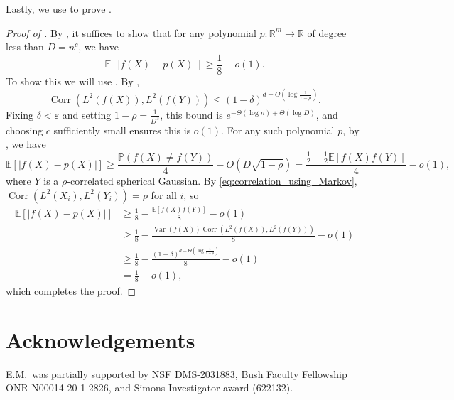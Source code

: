\documentclass[12pt,letterpaper]{amsart}
\def\E{\mathbb{E}}
\def\P{\mathbb{P}}
\def\R{\mathbb{R}}
\def\Var{\operatorname{Var}}
\def\Corr{\operatorname{Corr}}
\newcommand{\abs}[1]{\left\lvert#1\right\rvert}
\newcommand{\1}[1]{1_{\left\{#1\right\}}}
\theoremstyle{definition}
\theoremstyle{remark}
\begin{document}
Lastly, we use  to prove .
\begin{proof}[Proof of ]
    By \cite[Theorem 1.7]{diakonikolas2021optimality}, it suffices to show that for any polynomial $p:\R^m\to\R$ of degree less than $D=n^c$, we have 
    \[ \E[\abs{f(X)-p(X)}]\geq\frac{1}{8}-o(1). \]
    To show this we will use \cite[Theorem 1.5]{diakonikolas2021optimality}.
    By ,
    \[ \Corr(L^2(f(X)),L^2(f(Y))) \leq (1-\delta)^{d-\Theta(\log\frac{1}{1-\rho})}. \]
    Fixing $\delta<\varepsilon$ and setting $1-\rho=\frac{1}{D^3}$, this bound is $e^{-\Theta(\log n)+\Theta(\log D)}$, and choosing $c$ sufficiently small ensures this is $o(1)$.
    For any such polynomial $p$, by \cite[Theorem 1.5]{diakonikolas2021optimality}, we have
    \[ \E[\abs{f(X)-p(X)}]\geq\frac{\P(f(X)\neq f(Y))}{4}-O(D\sqrt{1-\rho}) = \frac{\frac{1}{2}-\frac{1}{2}\E[f(X)f(Y)]}{4} - o(1), \]
    where $Y$ is a $\rho$-correlated spherical Gaussian.
    By \eqref{eq:correlation_using_Markov}, $\Corr(L^2(X_i),L^2(Y_i))=\rho$ for all $i$, so
    \begin{align*}
        \E[\abs{f(X)-p(X)}]
        &\geq \frac{1}{8}-\frac{\E[f(X)f(Y)]}{8} - o(1)
        \\ &\geq \frac{1}{8}-\frac{\Var(f(X))\Corr(L^2(f(X)),L^2(f(Y)))}{8}-o(1)
        \\ &\geq \frac{1}{8}-\frac{(1-\delta)^{d-\Theta(\log\frac{1}{1-\rho})}}{8}-o(1)
        \\ &= \frac{1}{8}-o(1),
    \end{align*}
    which completes the proof.
\end{proof}

\section*{Acknowledgements}
E.M.\ was partially supported by NSF DMS-2031883, Bush Faculty Fellowship ONR-N00014-20-1-2826, and Simons Investigator award (622132).



\end{document}
